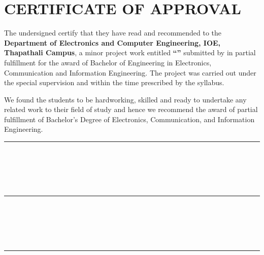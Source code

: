 \chapter*{CERTIFICATE OF APPROVAL}
{}

\noindent The undersigned certify that they have read and recommended to the
\textbf{Department of Electronics and Computer Engineering, IOE, Thapathali Campus},
a minor project work entitled \textbf{``\cTitle''} submitted by
\textbf{\authorList} in partial fulfillment for the award of Bachelor of
Engineering in Electronics, Communication and Information Engineering.
The project was carried out under the special supervision and within the time
prescribed by the syllabus.

\vspace{1em}

We found the students to be hardworking, skilled and ready to undertake
any related work to their field of study and hence we recommend the award of
partial fulfillment of Bachelor's Degree of Electronics, Communication, and
Information Engineering.

\vspace{2em}

\noindent
\begin{minipage}[t]{0.48\textwidth}
    \rule{6cm}{0.2mm} \\
    \cSupervisorTitle \\
    \cSupervisor \\
    \cSupervisorDept \\
    \cSupervisorAddress
\end{minipage}
\hfill
\begin{minipage}[t]{0.48\textwidth}
    \rule{6cm}{0.2mm} \\
    \cExternalExaminerTitle \\
    \cExternalExaminer \\
    \cExternalExaminerDept \\
    \cExternalExaminerAddress
\end{minipage}

\vspace{3em}

\noindent
\begin{minipage}[t]{0.48\textwidth}
    \rule{6cm}{0.2mm} \\
    \cHODTitle \\
    \cHOD \\
    \cHODDept \\
    \cHODAddress
\end{minipage}

\vspace{2em}

\noindent\cDate
